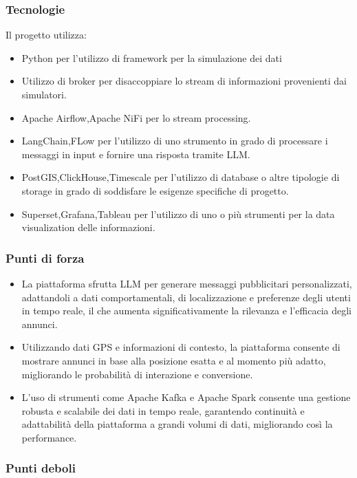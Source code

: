     \subsubsection{Tecnologie}
    Il progetto utilizza:
    \begin{itemize}
        \item Python per l'utilizzo di framework per la simulazione dei dati
        \item Utilizzo di broker per disaccoppiare lo stream di informazioni provenienti dai simulatori.
        \item Apache Airflow,Apache NiFi per lo stream processing.
        \item LangChain,FLow per l'utilizzo di uno strumento in grado di processare i messaggi in input e fornire una risposta tramite LLM.
        \item PostGIS,ClickHouse,Timescale per l'utilizzo di database o altre tipologie di storage in grado di soddisfare le esigenze specifiche di progetto. 
        \item Superset,Grafana,Tableau per l'utilizzo di uno o più strumenti per la data visualization delle informazioni.
    \end{itemize}

    \subsubsection{Punti di forza}

    \begin{itemize}
        \item La piattaforma sfrutta LLM per generare messaggi pubblicitari personalizzati, adattandoli a dati comportamentali, di localizzazione e preferenze degli utenti in tempo reale, il che aumenta significativamente la rilevanza e l’efficacia degli annunci.
        \item  Utilizzando dati GPS e informazioni di contesto, la piattaforma consente di mostrare annunci in base alla posizione esatta e al momento più adatto, migliorando le probabilità di interazione e conversione.
        \item L’uso di strumenti come Apache Kafka e Apache Spark consente una gestione robusta e scalabile dei dati in tempo reale, garantendo continuità e adattabilità della piattaforma a grandi volumi di dati, migliorando così la performance.
    \end{itemize}
    \subsubsection{Punti deboli}
    
